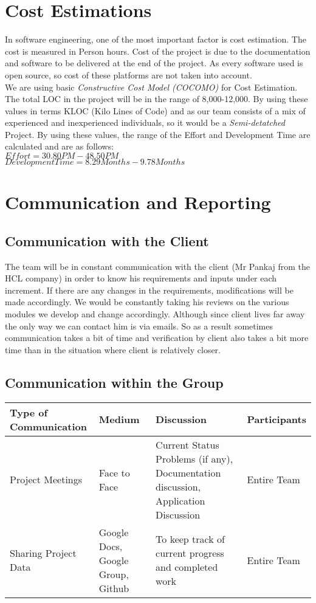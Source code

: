 \documentclass[
10pt, %
a4paper, %
oneside, %
headinclude,footinclude, %
BCOR5mm, %
]{scrartcl}
\begin{document}
\section{Cost Estimations}
In software engineering, one of the most important factor is cost estimation. The cost is measured in Person hours. Cost of the project is due to the documentation and software to be delivered at the end of the project. As every software used is open source, so cost of these platforms are not taken into account.
\\ We are using basic \textit{Constructive Cost Model (COCOMO)} for Cost Estimation.
\\The total LOC in the project will be in the range of 8,000-12,000. By using these values in terms KLOC (Kilo Lines of Code) and as our team consists of a mix of experienced and inexperienced individuals, so it would be a \textit{Semi-detatched} Project.
By using these values, the range of the Eﬀort and Development Time are calculated and are as follows:
\\$Effort = 30.80PM - 48.50PM$ 
\\$Development Time = 8.29 Months - 9.78 Months$




\section{Communication and Reporting}
\subsection{Communication with the Client}
The team will be in constant communication with the client (Mr Pankaj from the HCL company) in order to know his requirements and inputs under each increment. If there are any changes in the requirements, modifications will be made accordingly. We would be constantly taking his reviews on the various modules we develop and change accordingly. Although since client lives far away the only way we can contact him is via emails. So as a result sometimes communication takes a bit of time and verification by client also takes a bit more time than in the situation where client is relatively closer.

\subsection{Communication within the Group}
\begin{table}[h!]
\begin{tabular}{| p{3cm}| p{3cm}| p{3cm}| p{3cm}|} 
 \hline
Type of Communication &
Medium & Discussion & Participants\\ [1.5ex] 
 \hline\hline
Project Meetings & Face to Face &
Current Status Problems (if any),  Documentation discussion, Application Discussion& Entire Team\\
\hline
Sharing Project Data &
Google Docs, Google Group, Github &
To keep track of current progress and completed work &
Entire Team\\
\hline 
\end{tabular}
\end{table}
\end{document}
